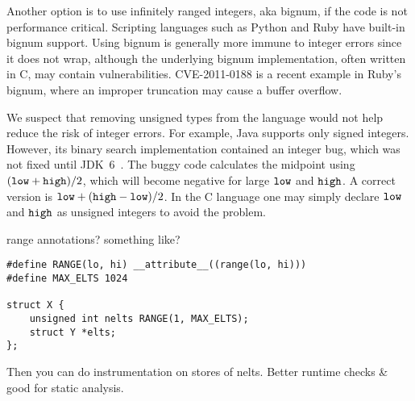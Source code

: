 Another option is to use infinitely ranged integers, aka bignum,
if the code is not performance critical.  Scripting languages such
as Python and Ruby have built-in bignum support.  Using bignum is
generally more immune to integer errors since it does not wrap,
although the underlying bignum implementation, often written in C,
may contain vulnerabilities.  CVE-2011-0188 is a recent example in
Ruby's bignum, where an improper truncation may cause a buffer
overflow.
%

We suspect that removing unsigned types from the language would
not help reduce the risk of integer errors.  For example, Java
supports only signed integers.  However, its binary search
implementation contained an integer bug, which was not fixed until
JDK~6~\cite{java-bsearch}.  The buggy code calculates the midpoint
using $(\texttt{low} + \texttt{high})/2$, which will become negative for
large $\texttt{low}$ and $\texttt{high}$.  A correct version is $\texttt{low}
+ (\texttt{high}-\texttt{low})/2$.  In the C language one may simply declare
$\texttt{low}$ and $\texttt{high}$ as unsigned integers to avoid the problem.

range annotations?  something like?
\begin{Verbatim}
#define RANGE(lo, hi) __attribute__((range(lo, hi)))
#define MAX_ELTS 1024

struct X {
	unsigned int nelts RANGE(1, MAX_ELTS);
	struct Y *elts;
};
\end{Verbatim}
Then you can do instrumentation on stores of nelts.
Better runtime checks \& good for static analysis.
\fi
